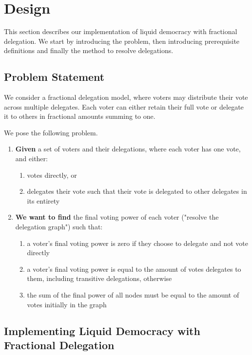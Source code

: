 \graphicspath{ {./figures/} }

\chapter{Design}
\label{sec:design}

This section describes our implementation of liquid democracy with fractional delegation. We start by introducing the problem, then introducing prerequisite definitions and finally the method to resolve delegations. 

\section{Problem Statement}

We consider a fractional delegation model, where voters may distribute their vote across multiple  delegates. Each voter can either retain their full vote or delegate it to others in fractional amounts summing to one.

We pose the following problem.

\begin{enumerate}
\item \textbf{Given} a set of voters and their delegations, where each voter has one vote, and either:
\begin{enumerate}
\item votes directly, or 
\item delegates their vote such that their vote is delegated to other delegates in its entirety
\end{enumerate}
\item \textbf{We want to find} the final voting power of each voter ("resolve the delegation graph") such that:
\begin{enumerate}
\item a voter's final voting power is zero if they choose to delegate and not vote directly 
\item a voter's final voting power is equal to the amount of votes delegates to them, including transitive delegations, otherwise
\item the sum of the final power of all nodes must be equal to the amount of votes initially in the graph
\end{enumerate}
\end{enumerate}

\section{Implementing Liquid Democracy with Fractional Delegation}
\label{sec:ld_with_frac_del}

